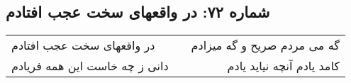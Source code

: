 \begin{center}
\section*{شماره ۷۲: در واقعهای سخت عجب افتادم}
\label{sec:072}
\begin{longtable}{l p{0.5cm} r}
در واقعهای سخت عجب افتادم
&&
گه می مردم صریح و گه میزادم
\\
دانی ز چه خاست این همه فریادم
&&
کامد یادم آنچه نیاید یادم
\\
\end{longtable}
\end{center}
